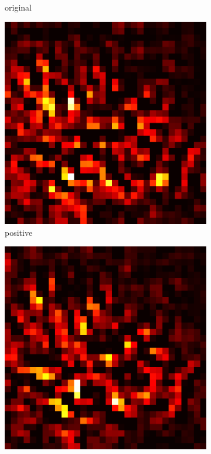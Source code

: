 \documentclass[preprint,12pt]{elsarticle}
\begin{document}
\begin{figure}
\begin{subfigure}{0.14\linewidth}
        \caption{original}
    \end{subfigure}
    \hfill
    \begin{subfigure}{0.14\textwidth}
        \centering
        \includegraphics[width=\linewidth]{../visualizations/examples/cifar10/resnet18/positive_saliency_map/8.png}
        \caption{positive}
    \end{subfigure}
    \hfill
    \begin{subfigure}{0.14\textwidth}
        \centering
        \includegraphics[width=\linewidth]{../visualizations/examples/cifar10/resnet18/negative_saliency_map/8.png}

\end{subfigure}
\end{figure}
\end{document}
